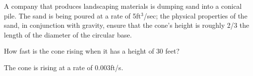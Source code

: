 {A company that produces landscaping materials is dumping sand into a conical pile. The sand is being poured at a rate of 5ft$^3$/sec; the physical properties of the sand, in conjunction with gravity, ensure that the cone's height is roughly 2/3 the length of the diameter of the circular base. 

How fast is the cone rising when it has a height of 30 feet?
}
{The cone is rising at a rate of $0.003$ft/s.
}

